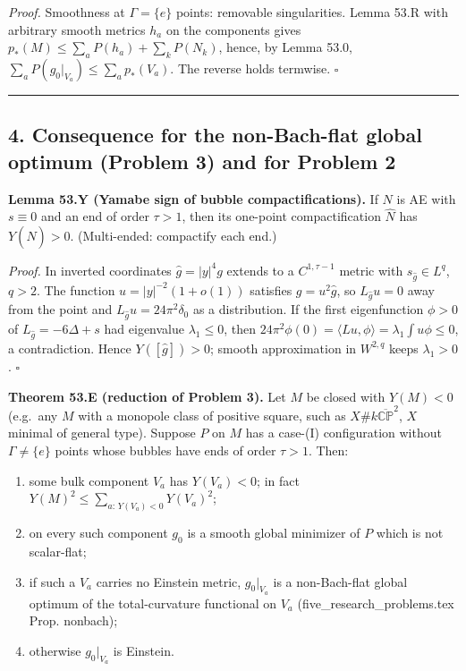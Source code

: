 \documentclass[
  10pt,
]{report}
\providecommand{\tightlist}{%
  \setlength{\itemsep}{0pt}\setlength{\parskip}{0pt}}
\begin{document}
\emph{Proof.} Smoothness at \(\Gamma=\{e\}\) points: removable
singularities. Lemma 53.R with arbitrary smooth metrics \(h_a\) on the
components gives \(p_*(M)\le\sum_aP(h_a)+\sum_kP(N_k)\), hence, by Lemma
53.0, \(\sum_aP(g_0|_{V_a})\le\sum_ap_*(V_a)\). The reverse holds
termwise. \(\square\)

\begin{center}\rule{0.5\linewidth}{0.5pt}\end{center}

\hypertarget{consequence-for-the-non-bach-flat-global-optimum-problem-3-and-for-problem-2}{%
\subsection{4. Consequence for the non-Bach-flat global optimum (Problem
3) and for Problem
2}\label{consequence-for-the-non-bach-flat-global-optimum-problem-3-and-for-problem-2}}

\textbf{Lemma 53.Y (Yamabe sign of bubble compactifications).} If \(N\)
is AE with \(s\equiv0\) and an end of order \(\tau>1\), then its
one-point compactification \(\widehat N\) has \(Y(\widehat N)>0\).
(Multi-ended: compactify each end.)

\emph{Proof.} In inverted coordinates \(\hat g=|y|^4g\) extends to a
\(C^{1,\tau-1}\) metric with \(s_{\hat g}\in L^q\), \(q>2\). The
function \(u=|y|^{-2}(1+o(1))\) satisfies \(g=u^2\hat g\), so
\(L_{\hat g}u=0\) away from the point and
\(L_{\hat g}u=24\pi^2\delta_0\) as a distribution. If the first
eigenfunction \(\phi>0\) of \(L_{\hat g}=-6\Delta+s\) had eigenvalue
\(\lambda_1\le0\), then
\(24\pi^2\phi(0)=\langle L u,\phi\rangle=\lambda_1\int u\phi\le0\), a
contradiction. Hence \(Y([\hat g])>0\); smooth approximation in
\(W^{2,q}\) keeps \(\lambda_1>0\). \(\square\)

\textbf{Theorem 53.E (reduction of Problem 3).} Let \(M\) be closed with
\(Y(M)<0\) (e.g.~any \(M\) with a monopole class of positive square,
such as \(X\#k\overline{\mathbb{CP}}^2\), \(X\) minimal of general
type). Suppose \(P\) on \(M\) has a case-(I) configuration without
\(\Gamma\ne\{e\}\) points whose bubbles have ends of order \(\tau>1\).
Then:

\begin{enumerate}
\def\labelenumi{\arabic{enumi}.}
\tightlist
\item
  some bulk component \(V_a\) has \(Y(V_a)<0\); in fact
  \(Y(M)^2\le\sum_{a:\,Y(V_a)<0}Y(V_a)^2\);
\item
  on every such component \(g_0\) is a smooth global minimizer of \(P\)
  which is not scalar-flat;
\item
  if such a \(V_a\) carries no Einstein metric, \(g_0|_{V_a}\) is a
  non-Bach-flat global optimum of the total-curvature functional on
  \(V_a\) (five\_research\_problems.tex Prop. nonbach);
\item
  otherwise \(g_0|_{V_a}\) is Einstein.
\end{enumerate}
\end{document}
